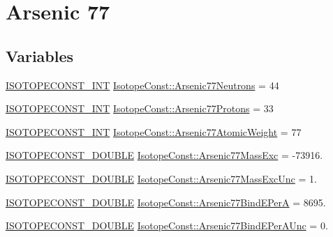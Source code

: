\hypertarget{group___isotope_const-_arsenic-_as77}{}\section{Arsenic 77}
\label{group___isotope_const-_arsenic-_as77}
\subsection*{Variables}
\begin{DoxyCompactItemize}
\item 
\mbox{\hyperlink{group___isotope_const-_macros_ga5f18360b3e99483a35c32d789e62621c}{I\+S\+O\+T\+O\+P\+E\+C\+O\+N\+S\+T\+\_\+\+I\+NT}} \mbox{\hyperlink{group___isotope_const-_arsenic-_as77_ga5359124cd8b49e095d969888f931a74f}{Isotope\+Const\+::\+Arsenic77\+Neutrons}} = 44
\item 
\mbox{\hyperlink{group___isotope_const-_macros_ga5f18360b3e99483a35c32d789e62621c}{I\+S\+O\+T\+O\+P\+E\+C\+O\+N\+S\+T\+\_\+\+I\+NT}} \mbox{\hyperlink{group___isotope_const-_arsenic-_as77_ga42cc3ee76ec991dc0d4be12911e228a4}{Isotope\+Const\+::\+Arsenic77\+Protons}} = 33
\item 
\mbox{\hyperlink{group___isotope_const-_macros_ga5f18360b3e99483a35c32d789e62621c}{I\+S\+O\+T\+O\+P\+E\+C\+O\+N\+S\+T\+\_\+\+I\+NT}} \mbox{\hyperlink{group___isotope_const-_arsenic-_as77_gab0c4dd4fea96f358138c9a8206ca862a}{Isotope\+Const\+::\+Arsenic77\+Atomic\+Weight}} = 77
\item 
\mbox{\hyperlink{group___isotope_const-_macros_ga8f45a7272ce02c0b4c65c44636ed719a}{I\+S\+O\+T\+O\+P\+E\+C\+O\+N\+S\+T\+\_\+\+D\+O\+U\+B\+LE}} \mbox{\hyperlink{group___isotope_const-_arsenic-_as77_ga3a0dadfdb2311c3faf40ef374dcb7b34}{Isotope\+Const\+::\+Arsenic77\+Mass\+Exc}} = -\/73916.
\item 
\mbox{\hyperlink{group___isotope_const-_macros_ga8f45a7272ce02c0b4c65c44636ed719a}{I\+S\+O\+T\+O\+P\+E\+C\+O\+N\+S\+T\+\_\+\+D\+O\+U\+B\+LE}} \mbox{\hyperlink{group___isotope_const-_arsenic-_as77_ga253aa70470b3a22875205bbe99faf29c}{Isotope\+Const\+::\+Arsenic77\+Mass\+Exc\+Unc}} = 1.
\item 
\mbox{\hyperlink{group___isotope_const-_macros_ga8f45a7272ce02c0b4c65c44636ed719a}{I\+S\+O\+T\+O\+P\+E\+C\+O\+N\+S\+T\+\_\+\+D\+O\+U\+B\+LE}} \mbox{\hyperlink{group___isotope_const-_arsenic-_as77_ga5443de8d4609579cc19cd36e1ead80dd}{Isotope\+Const\+::\+Arsenic77\+Bind\+E\+PerA}} = 8695.
\item 
\mbox{\hyperlink{group___isotope_const-_macros_ga8f45a7272ce02c0b4c65c44636ed719a}{I\+S\+O\+T\+O\+P\+E\+C\+O\+N\+S\+T\+\_\+\+D\+O\+U\+B\+LE}} \mbox{\hyperlink{group___isotope_const-_arsenic-_as77_gacd1c57db16c3f563c5335953fda0072c}{Isotope\+Const\+::\+Arsenic77\+Bind\+E\+Per\+A\+Unc}} = 0.

\end{DoxyCompactItemize}
